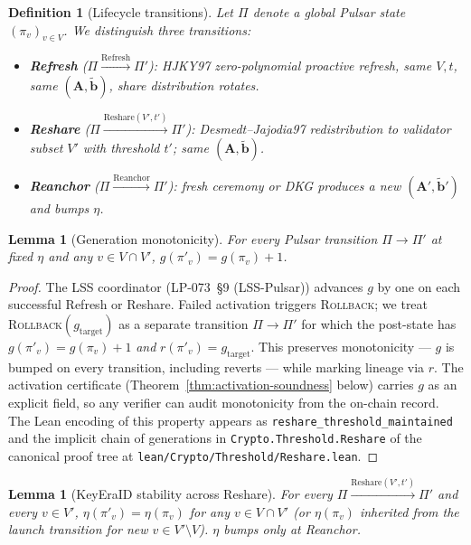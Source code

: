 \documentclass[11pt]{article}
\newtheorem{lemma}[theorem]{Lemma}
\newtheorem{definition}{Definition}
\begin{document}
\begin{definition}[Lifecycle transitions]
\label{def:transitions}
Let $\Pi$ denote a global Pulsar state $(\pi_v)_{v \in V}$. We
distinguish three transitions:
\begin{itemize}[nosep]
  \item \textbf{Refresh} ($\Pi \xrightarrow{\mathrm{Refresh}} \Pi'$):
    HJKY97 zero-polynomial proactive refresh, same $V, t$, same
    $(\mathbf{A}, \tilde{\mathbf{b}})$, share distribution rotates.
  \item \textbf{Reshare} ($\Pi \xrightarrow{\mathrm{Reshare}(V', t')} \Pi'$):
    Desmedt--Jajodia97 redistribution to validator subset $V'$ with
    threshold $t'$; same $(\mathbf{A}, \tilde{\mathbf{b}})$.
  \item \textbf{Reanchor} ($\Pi \xrightarrow{\mathrm{Reanchor}} \Pi'$):
    fresh ceremony or DKG produces a new $(\mathbf{A}', \tilde{\mathbf{b}}')$
    and bumps $\eta$.
\end{itemize}
\end{definition}

\begin{lemma}[Generation monotonicity]
\label{lem:gen-mono}
For every Pulsar transition $\Pi \to \Pi'$ at fixed $\eta$ and any
$v \in V \cap V'$, $g(\pi'_v) = g(\pi_v) + 1$.
\end{lemma}

\begin{proof}
The LSS coordinator (LP-073~\S9 (LSS-Pulsar)) advances $g$ by one
on each successful Refresh or Reshare. Failed activation triggers
\textsc{Rollback}; we treat \textsc{Rollback}$(g_{\mathrm{target}})$ as
a separate transition $\Pi \to \Pi'$ for which the post-state has
$g(\pi'_v) = g(\pi_v) + 1$ \emph{and} $r(\pi'_v) = g_{\mathrm{target}}$.
This preserves monotonicity --- $g$ is bumped on every transition,
including reverts --- while marking lineage via $r$. The activation
certificate (Theorem~\ref{thm:activation-soundness} below) carries
$g$ as an explicit field, so any verifier can audit monotonicity from
the on-chain record. The Lean encoding of this property appears as
\texttt{reshare\_threshold\_maintained} and the implicit chain of
generations in \texttt{Crypto.Threshold.Reshare} of the canonical
proof tree at \texttt{lean/Crypto/Threshold/Reshare.lean}.
\end{proof}

\begin{lemma}[KeyEraID stability across Reshare]
\label{lem:eta-stable}
For every $\Pi \xrightarrow{\mathrm{Reshare}(V', t')} \Pi'$ and every
$v \in V'$, $\eta(\pi'_v) = \eta(\pi_v)$ for any $v \in V \cap V'$
(or $\eta(\pi_v)$ inherited from the launch transition for new
$v \in V' \setminus V$). $\eta$ bumps only at Reanchor.
\end{lemma}
\end{document}
